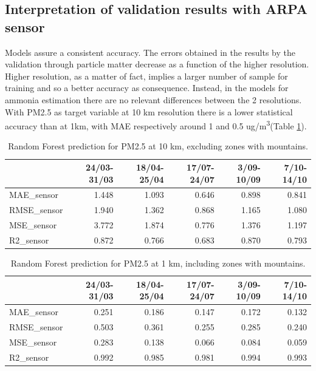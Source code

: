 \subsection{Interpretation of validation results with ARPA sensor}
Models assure a consistent accuracy.
The errors obtained in the results by the validation through particle matter decrease as a function of the higher resolution.
Higher resolution, as a matter of fact, implies a larger number of sample for training and so a better accuracy as consequence.
Instead, in the models for ammonia estimation there are no relevant differences between the 2 resolutions.
With PM2.5 as target variable at 10 km resolution there is a lower statistical accuracy than at 1km, with MAE respectively around 1 and 0.5 ug/m\textsuperscript{3}(Table \ref{tab:res1km}). 
\begin{table}[H]
\begin{tabular}{lrrrrr}
\toprule
  &  24/03-31/03 &  18/04-25/04 &  17/07-24/07 &  3/09-10/09 &  7/10-14/10 \\
\midrule
  MAE\_sensor &        1.448 &        1.093 &        0.646 &       0.898 &       0.841 \\
RMSE\_sensor &        1.940 &        1.362 &        0.868 &       1.165 &       1.080 \\
 MSE\_sensor &        3.772 &        1.874 &        0.776 &       1.376 &       1.197 \\
  R2\_sensor &        0.872 &        0.766 &        0.683 &       0.870 &       0.793 \\
\bottomrule
\end{tabular}
\caption{Random Forest prediction for PM2.5 at 10 km, excluding zones with mountains.}
\end{table}
\begin{table}[H]
\begin{tabular}{lrrrrr}
\toprule
  &  24/03-31/03 &  18/04-25/04 &  17/07-24/07 &  3/09-10/09 &  7/10-14/10 \\
\midrule
  MAE\_sensor &        0.251 &        0.186 &        0.147 &       0.172 &       0.132 \\
RMSE\_sensor &        0.503 &        0.361 &        0.255 &       0.285 &       0.240 \\
 MSE\_sensor &        0.283 &        0.138 &        0.066 &       0.084 &       0.059 \\
  R2\_sensor &        0.992 &        0.985 &        0.981 &       0.994 &       0.993 \\
\bottomrule
\end{tabular}
\caption{Random Forest prediction for PM2.5 at 1 km, including zones with mountains.}
\label{tab:res1km}
\end{table}

